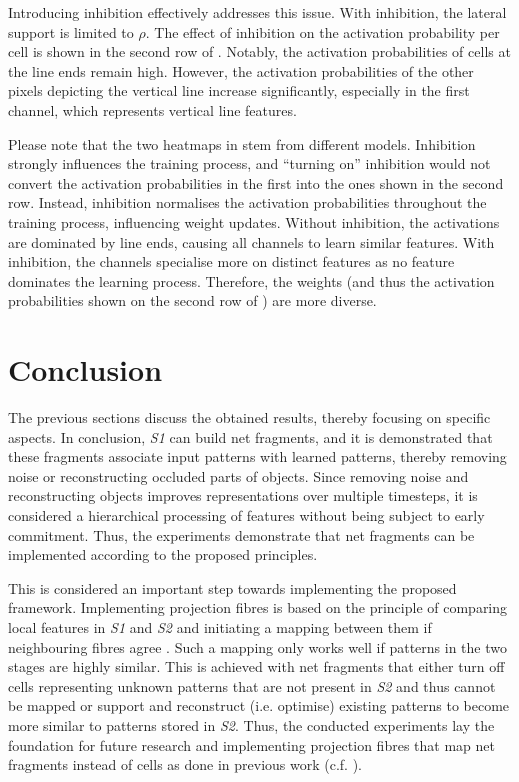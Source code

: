 Introducing inhibition effectively addresses this issue.
With inhibition, the lateral support is limited to $\rho$.
The effect of inhibition on the activation probability per cell is shown in the second row of .
Notably, the activation probabilities of cells at the line ends remain high. However, the activation probabilities of the other pixels depicting the vertical line increase significantly, especially in the first channel, which represents vertical line features.

Please note that the two heatmaps in  stem from different models.
Inhibition strongly influences the training process, and ``turning on'' inhibition would not convert the activation probabilities in the first into the ones shown in the second row.
Instead, inhibition normalises the activation probabilities throughout the training process, influencing weight updates.
Without inhibition, the activations are dominated by line ends, causing all channels to learn similar features.
With inhibition, the channels specialise more on distinct features as no feature dominates the learning process. Therefore, the weights (and thus the activation probabilities shown on the second row of ) are more diverse.

\section{Conclusion}
The previous sections discuss the obtained results, thereby focusing on specific aspects.
In conclusion, \emph{S1} can build net fragments, and it is demonstrated that these fragments associate input patterns with learned patterns, thereby removing noise or reconstructing occluded parts of objects.
Since removing noise and reconstructing objects improves representations over multiple timesteps, it is considered a hierarchical processing of features without being subject to early commitment.
Thus, the experiments demonstrate that net fragments can be implemented according to the proposed principles.

This is considered an important step towards implementing the proposed framework.
Implementing projection fibres is based on the principle of comparing local features in \emph{S1} and \emph{S2} and initiating a mapping between them if neighbouring fibres agree .
Such a mapping only works well if patterns in the two stages are highly similar.
This is achieved with net fragments that either turn off cells representing unknown patterns that are not present in \emph{S2} and thus cannot be mapped or support and reconstruct (i.e. optimise) existing patterns to become more similar to patterns stored in \emph{S2}.
Thus, the conducted experiments lay the foundation for future research and implementing projection fibres that map net fragments instead of cells as done in previous work (c.f. ).